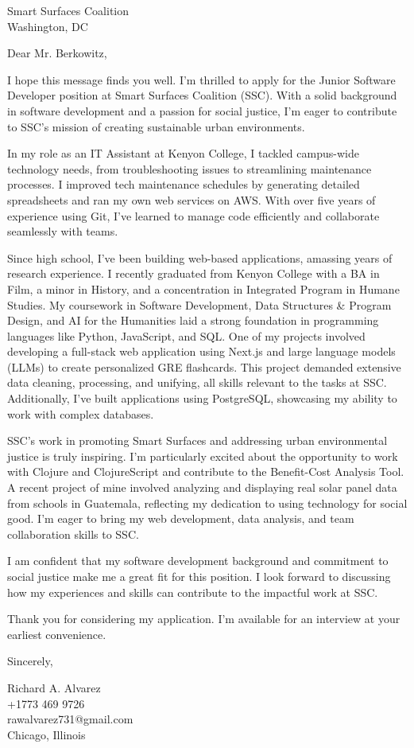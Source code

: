 \documentclass[a4paper,10pt]{letter}
\begin{document}
\begin{letter}{Smart Surfaces Coalition \\
Washington, DC}

\opening{Dear Mr. Berkowitz,}

I hope this message finds you well. I’m thrilled to apply for the Junior Software Developer position at Smart Surfaces Coalition (SSC). With a solid background in software development and a passion for social justice, I’m eager to contribute to SSC’s mission of creating sustainable urban environments.

In my role as an IT Assistant at Kenyon College, I tackled campus-wide technology needs, from troubleshooting issues to streamlining maintenance processes. I improved tech maintenance schedules by generating detailed spreadsheets and ran my own web services on AWS. With over five years of experience using Git, I’ve learned to manage code efficiently and collaborate seamlessly with teams.

Since high school, I’ve been building web-based applications, amassing years of research experience. I recently graduated from Kenyon College with a BA in Film, a minor in History, and a concentration in Integrated Program in Humane Studies. My coursework in Software Development, Data Structures \& Program Design, and AI for the Humanities laid a strong foundation in programming languages like Python, JavaScript, and SQL. One of my projects involved developing a full-stack web application using Next.js and large language models (LLMs) to create personalized GRE flashcards. This project demanded extensive data cleaning, processing, and unifying, all skills relevant to the tasks at SSC. Additionally, I’ve built applications using PostgreSQL, showcasing my ability to work with complex databases.

SSC’s work in promoting Smart Surfaces and addressing urban environmental justice is truly inspiring. I’m particularly excited about the opportunity to work with Clojure and ClojureScript and contribute to the Benefit-Cost Analysis Tool. A recent project of mine involved analyzing and displaying real solar panel data from schools in Guatemala, reflecting my dedication to using technology for social good. I’m eager to bring my web development, data analysis, and team collaboration skills to SSC.

I am confident that my software development background and commitment to social justice make me a great fit for this position. I look forward to discussing how my experiences and skills can contribute to the impactful work at SSC.

Thank you for considering my application. I’m available for an interview at your earliest convenience.

\closing{}


Sincerely,

Richard A. Alvarez \\
+1773 469 9726 \\
rawalvarez731@gmail.com \\
Chicago, Illinois

\end{letter}
\end{document}
